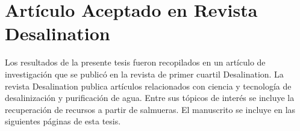 \chapter{Artículo Aceptado en Revista Desalination}\label{sec:article}
Los resultados de la presente tesis fueron recopilados en un artículo de investigación que se publicó en la revista de primer cuartil {Desalination}. La revista {Desalination} publica artículos relacionados con ciencia y tecnología de desalinización y purificación de agua. Entre sus tópicos de interés se incluye la recuperación de recursos a partir de salmueras. El manuscrito se incluye en las siguientes páginas de esta tesis.
